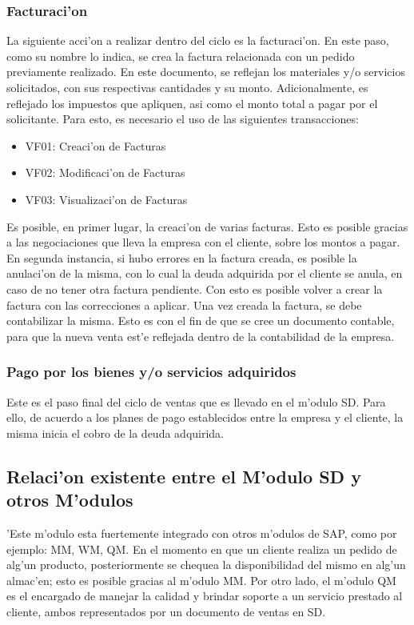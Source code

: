 \subsubsection*{Facturaci'on}
	La siguiente acci'on a realizar dentro del ciclo es la facturaci'on. En este paso, como su nombre lo indica, se crea la factura relacionada con un pedido previamente realizado. En este documento, se reflejan los materiales y/o servicios solicitados, con sus respectivas cantidades y su monto. Adicionalmente, es reflejado los impuestos que apliquen, asi como  el monto total a pagar por el solicitante. Para esto, es necesario el uso de las siguientes transacciones:
\begin{itemize}
\item VF01: Creaci'on de Facturas
\item VF02: Modificaci'on de Facturas
\item VF03: Visualizaci'on de Facturas
\end{itemize}
\indent Es posible, en primer lugar, la creaci'on de varias facturas. Esto es posible gracias a las negociaciones que lleva la empresa con el cliente, sobre los montos a pagar. En segunda instancia, si hubo errores en la factura creada, es posible la anulaci'on de la misma, con lo cual la deuda adquirida por el cliente se anula, en caso de no tener otra factura pendiente. Con esto es posible volver a crear la factura con las correcciones a aplicar. 
\newline
\newline
\indent Una vez creada la factura, se debe contabilizar la misma. Esto es con el fin de que se cree un documento contable, para que la nueva venta est'e reflejada dentro de la contabilidad de la empresa.
	
\subsubsection*{Pago por los bienes y/o servicios adquiridos}
	Este es el paso final del ciclo de ventas que es llevado en el m'odulo SD. Para ello, de acuerdo a los planes de pago establecidos entre la empresa y el cliente, la misma inicia el cobro de la deuda adquirida.
	

\subsection{Relaci'on existente entre el M'odulo SD y otros M'odulos}
'Este m'odulo esta fuertemente integrado con otros m'odulos de SAP, como por ejemplo: MM, WM, QM. 
\newline
\newline
En el momento en que un cliente realiza un pedido de alg'un producto, posteriormente se chequea la disponibilidad del mismo en alg'un almac'en; esto es posible gracias al m'odulo MM. 
\newline
\newline
Por otro lado, el m'odulo QM es el encargado de manejar la calidad y brindar soporte a un servicio prestado al cliente, ambos representados por un documento de ventas en SD. 

